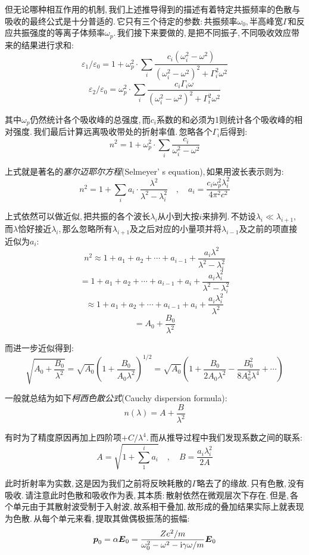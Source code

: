 但无论哪种相互作用的机制,\,我们上述推导得到的描述有着特定共振频率的色散与吸收的最终公式是十分普适的.\,它只有三个待定的参数:\,共振频率$\omega_0$,\,半高峰宽$\Gamma$和反应共振强度的等离子体频率$\omega_p$.\,我们接下来要做的,\,是把不同振子,\,不同吸收效应带来的结果进行求和:
\[\varepsilon_1/\varepsilon_0=1+\omega_p^2\cdot\sum_i\frac{c_i(\omega_i^2-\omega^2)}{(\omega_i^2-\omega^2)^2+\Gamma_i^2\omega^2}\]
\[\varepsilon_2/\varepsilon_0=\omega_p^2\cdot\sum_i\frac{c_i\Gamma_i\omega}{(\omega_i^2-\omega^2)^2+\Gamma_i^2\omega^2}\]

其中$\omega_p$仍然统计各个吸收峰的总强度,\,而$c_i$系数的和必须为1则统计各个吸收峰的相对强度.\,我们最后计算远离吸收带处的折射率值.\,忽略各个$\Gamma_i$后得到:
\[n^2=1+\omega_p^2\cdot\sum_i\frac{c_i}{\omega_i^2-\omega^2}\]

上式就是著名的\emph{塞尔迈耶尔方程}(Selmeyer'
s equation),\,如果用波长表示则为:
\[n^2=1+\sum_i a_i\cdot\frac{\lambda^2}{\lambda^2-\lambda_i^2}\quad,\quad a_i=\frac{c_i\omega_p^2\lambda_i^2}{4\pi^2c^2}\]

上式依然可以做近似,\,把共振的各个波长$\lambda_i$从小到大按$i$来排列.\,不妨设$\lambda_i\ll\lambda_{i+1}$,\,而$\lambda$恰好接近$\lambda_i$,\,那么忽略所有$\lambda_{i+1}$及之后对应的小量项并将$\lambda_{i-1}$及之前的项直接近似为$a_i$:
\[n^2\approx 1+a_1+a_2+\cdots+a_{i-1}+\frac{a_i\lambda^2}{\lambda^2-\lambda_i^2}\]
\[= 1+a_1+a_2+\cdots+a_{i-1}+a_i+\frac{a_i\lambda_i^2}{\lambda^2-\lambda_i^2}\]
\[\approx 1+a_1+a_2+\cdots+a_{i-1}+a_i+\frac{a_i\lambda_i^2}{\lambda^2}\]
\[=A_0+\frac{B_0}{\lambda^2}\]

而进一步近似得到:
\[\sqrt{A_0+\frac{B_0}{\lambda^2}}=\sqrt{A_0}\left(1+\frac{B_0}{A_0\lambda^2}\right)^{1/2}=\sqrt{A_0}\left(1+\frac{B_0}{2A_0\lambda^2}-\frac{B_0^2}{8A_0^2 \lambda^4}+\cdots\right)\]

一般就总结为如下\emph{柯西色散公式}(Cauchy dispersion formula):
\[n(\lambda)=A+\frac{B}{\lambda^2}\]

有时为了精度原因再加上四阶项$+C/\lambda^4$.\,而从推导过程中我们发现系数之间的联系:
\[A=\sqrt{1+\sum_1^i a_i}\quad ,\quad B=\frac{a_i\lambda_i^2}{2A}\]

此时折射率为实数,\,这是因为我们之前将反映耗散的$\Gamma$略去了的缘故.\,只有色散,\,没有吸收.\,请注意此时色散和吸收作为表,\,其本质:\,散射依然在微观层次下存在.\,但是,\,各个单元由于其散射波受制于入射波,\,故系相干叠加,\,故形成的叠加结果实际上就表现为色散.\,从每个单元来看,\,提取其做偶极振荡的振幅:
\[\boldsymbol{p}_0=\alpha\boldsymbol{E}_0=\frac{Ze^2/m}{\omega_0^2-\omega^2-{\rm i} \gamma\omega/m}\boldsymbol{E}_0\]

